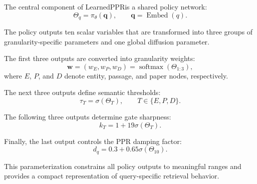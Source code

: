 \documentclass[conference]{IEEEtran}
\newcommand{\method}{LearnedPPR}
\newcommand{\q}{q}
\newcommand{\policy}{\pi_{\theta}}
\begin{document}
The central component of \method is a shared policy network:
\begin{equation}
\Theta_{\q}
=
\policy(\mathbf{q}),
\qquad
\mathbf{q}=\operatorname{Embed}(\q).
\end{equation}

The policy outputs ten scalar variables that are transformed into
three groups of granularity-specific parameters and one global
diffusion parameter.

The first three outputs are converted into granularity weights:
\begin{equation}
\mathbf{w}
=
(w_E,w_P,w_D)
=
\operatorname{softmax}(\Theta_{1:3}),
\label{eq:weights}
\end{equation}
where $E$, $P$, and $D$ denote entity, passage, and paper nodes,
respectively.

The next three outputs define semantic thresholds:
\begin{equation}
\tau_T
=
\sigma(\Theta_T),
\qquad
T\in\{E,P,D\}.
\label{eq:threshold}
\end{equation}

The following three outputs determine gate sharpness:
\begin{equation}
k_T
=
1+19\sigma(\Theta_T).
\label{eq:slope}
\end{equation}

Finally, the last output controls the PPR damping factor:
\begin{equation}
d_{\q}
=
0.3+0.65\sigma(\Theta_{10}).
\label{eq:damping}
\end{equation}

This parameterization constrains all policy outputs to meaningful
ranges and provides a compact representation of query-specific
retrieval behavior.
\end{document}

